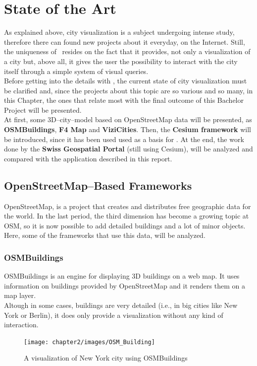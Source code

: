 \section{State of the Art} \label{stateOfTheArt}
As explained above, city visualization is a subject undergoing intense study, therefore there can found new projects about it everyday, on the Internet. Still, the uniqueness of \applicationName\ resides on the fact that it provides, not only a visualization of a city but, above all, it gives the user the possibility to interact with the city itself through a simple system of visual queries.\\

Before getting into the details with \applicationName, the current state of city visualization must be clarified and, since the projects about this topic are so various and so many, in this Chapter, the ones that relate most with the final outcome of this Bachelor Project will be presented.\\

At first, some 3D--city--model based on OpenStreetMap data will be presented, as {\bf OSMBuildings}, {\bf F4 Map} and {\bf ViziCities}. Then, the {\bf Cesium framework} will be introduced, since it has been used used as a basis for \applicationName. At the end, the work done by the {\bf Swiss Geospatial Portal} (still using Cesium), will be analyzed and compared with the application described in this report. 
\subsection{OpenStreetMap--Based Frameworks}
OpenStreetMap, is a project that creates and distributes free geographic data for the world. In the last period, the third dimension has become a growing topic at OSM, so it is now possible to add detailed buildings and a lot of minor objects. Here, some of the frameworks that use this data, will be analyzed.
\subsubsection{OSMBuildings}
OSMBuildings is an engine for displaying 3D buildings on a web map. It uses information on buildings provided by OpenStreetMap and it renders them on a map layer.\\Altough in some cases, buildings are very detailed (i.e., in big cities like New York or Berlin), it does only provide a visualization without any kind of interaction.
\begin{figure} [H]
\centering
\texttt{[image: chapter2/images/OSM\_Building]}
\caption{A visualization of New York city using OSMBuildings}
\label{fig:OSM_Building}
\end{figure}

